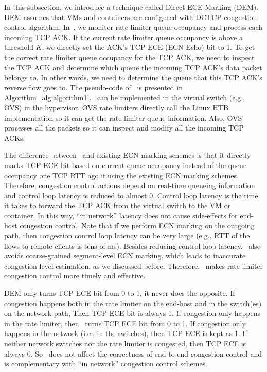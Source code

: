 In this subsection, we introduce a technique called Direct ECE Marking (DEM). 
DEM assumes that VMs and containers are configured with DCTCP congestion control algorithm. 
In~\dem{}, we monitor rate limiter queue occupancy and process each incoming TCP ACK. 
If the current rate limiter queue occupancy is above a threshold $K$, 
we directly set the ACK's TCP ECE (ECN Echo) bit to 1.
To get the correct rate limiter queue occupancy for the TCP ACK, we need to inspect the TCP ACK and
determine which queue the incoming TCP ACK's data packet belongs to. In other words, we need to 
determine the queue that this TCP ACK's reverse flow goes to.
The pseudo-code of~\dem{} is presented in Algorithm~\ref{alg:algorithm1}.~\dem{} can be
implemented in the virtual switch (e.g., OVS) in the hypervisor. OVS rate limiters directly call
the Linux HTB implementation so it can get the rate limiter queue information. Also, OVS processes all the packets
so it can inspect and modify all the incoming TCP ACKs. 

The difference between~\dem{} 
and existing ECN marking schemes is that it directly marks TCP ECE bit based on 
current queue occupancy instead of the queue occupancy one TCP RTT ago if using the existing ECN marking schemes.
Therefore, congestion control actions depend on real-time queueing information and control loop latency 
is reduced to almost 0. Control loop latency is the time it takes to forward the TCP ACK from the 
virtual switch to the VM or container. In this way, ``in network'' latency does not cause 
side-effects for end-host congestion control. Note that if we perform ECN marking on the outgoing path, then 
congestion control loop latency can be very large (e.g., RTT of the flows to remote clients is tens of ms).
Besides reducing control loop latency,~\dem{} also avoids coarse-grained segment-level ECN marking, 
which leads to inaccurate congestion level estimation, as we discussed before.
Therefore,~\dem{} makes rate limiter congestion control more timely and effective.

DEM only turns TCP ECE bit from 0 to 1, it never does the opposite. 
If congestion happens both in the rate 
limiter on the end-host and in the switch(es) on the network path, Then TCP ECE bit is always 1. 
If congestion only happens
in the rate limiter, then~\dem{} turns TCP ECE bit from 0 to 1. 
If congestion only happens in the network (i.e., in the switches), then TCP ECE is kept as 1.
If neither network switches nor the rate limiter is congested, then TCP ECE is always 0.
So~\dem{} does not affect the correctness of end-to-end
congestion control and is complementary with ``in network'' congestion control schemes.


